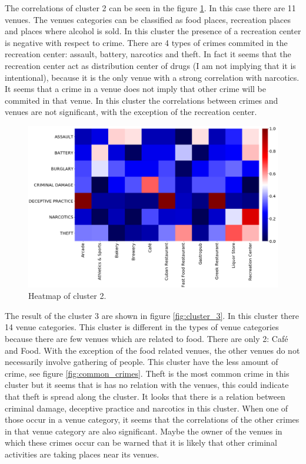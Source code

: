 \documentclass[a4paper,12pt]{article}
\begin{document}
The correlations of cluster 2 can be seen in the figure \ref{fig:cluster_2}. In this case there are 11 venues. The venues categories can be classified as food places, recreation places and places where alcohol is sold. In this cluster the presence of a recreation center is negative with respect to crime. There are 4 types of crimes commited in the recreation center: assault, battery, narcotics and theft. In fact it seems that the recreation center act as distribution center of drugs (I am not implying that it is intentional), because it is the only venue with a strong correlation with narcotics. It seems that a crime in a venue does not imply that other crime will be commited in that venue. In this cluster the correlations between crimes and venues are not significant, with the exception of the recreation center.  
\begin{figure}[hb]
\centering 
\includegraphics[scale=0.65]{Heatmap_cluster_2} 
\caption{Heatmap of cluster 2. 
\label{fig:cluster_2}} 
\end{figure}

The result of the cluster 3 are shown in figure \ref{fig:cluster_3}. In this cluster there 14 venue categories. This cluster is different in the types of venue categories because there are few venues which are related to food. There are only 2: Café and Food. With the exception of the food related venues, the other venues do not necessarily involve gathering of people.  This cluster have the less amount of crime, see figure \ref{fig:common_crimes}. Theft is the most common crime in this cluster but it seems that is has no relation with the venues, this could indicate that theft is spread along the cluster. It looks that there is a relation between criminal damage, deceptive practice and narcotics in this cluster. When one of those occur in a venue category, it seems that the correlations of the other crimes in that venue category are also significant. Maybe the owner of the venues in which these crimes occur can be warned that it is likely that other criminal activities are taking places near its venues.  
\end{document}
